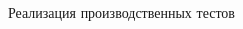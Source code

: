 \documentclass[unicode, notheorems]{beamer}
\begin{document}
\begin{frame}{Реализация производственных тестов}
\begin{columns}[c]
\begin{column}{0.56\linewidth}
\begin{figure}[h]
\begin{center}
\begin{tikzpicture}[node distance = 2cm, auto]
	

\end{tikzpicture}
\end{center}
\end{figure}
\end{column}
\end{columns}
\end{frame}
\end{document}
